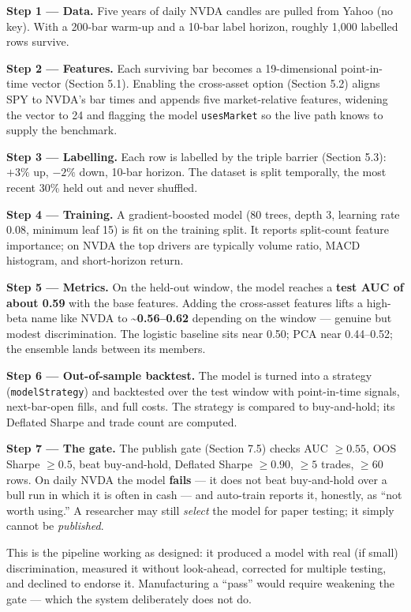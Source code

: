 \documentclass[
  11pt,
]{article}
\begin{document}
\textbf{Step 1 --- Data.} Five years of daily NVDA candles are pulled
from Yahoo (no key). With a 200-bar warm-up and a 10-bar label horizon,
roughly 1,000 labelled rows survive.

\textbf{Step 2 --- Features.} Each surviving bar becomes a
19-dimensional point-in-time vector (Section 5.1). Enabling the
cross-asset option (Section 5.2) aligns SPY to NVDA's bar times and
appends five market-relative features, widening the vector to 24 and
flagging the model \texttt{usesMarket} so the live path knows to supply
the benchmark.

\textbf{Step 3 --- Labelling.} Each row is labelled by the triple
barrier (Section 5.3): \(+3\%\) up, \(-2\%\) down, 10-bar horizon. The
dataset is split temporally, the most recent 30\% held out and never
shuffled.

\textbf{Step 4 --- Training.} A gradient-boosted model (80 trees, depth
3, learning rate 0.08, minimum leaf 15) is fit on the training split. It
reports split-count feature importance; on NVDA the top drivers are
typically volume ratio, MACD histogram, and short-horizon return.

\textbf{Step 5 --- Metrics.} On the held-out window, the model reaches a
\textbf{test AUC of about 0.59} with the base features. Adding the
cross-asset features lifts a high-beta name like NVDA to
\textbf{\textasciitilde0.56--0.62} depending on the window --- genuine
but modest discrimination. The logistic baseline sits near 0.50; PCA
near 0.44--0.52; the ensemble lands between its members.

\textbf{Step 6 --- Out-of-sample backtest.} The model is turned into a
strategy (\texttt{modelStrategy}) and backtested over the test window
with point-in-time signals, next-bar-open fills, and full costs. The
strategy is compared to buy-and-hold; its Deflated Sharpe and trade
count are computed.

\textbf{Step 7 --- The gate.} The publish gate (Section 7.5) checks AUC
\(\ge 0.55\), OOS Sharpe \(\ge 0.5\), beat buy-and-hold, Deflated Sharpe
\(\ge 0.90\), \(\ge 5\) trades, \(\ge 60\) rows. On daily NVDA the model
\textbf{fails} --- it does not beat buy-and-hold over a bull run in
which it is often in cash --- and auto-train reports it, honestly, as
``not worth using.'' A researcher may still \emph{select} the model for
paper testing; it simply cannot be \emph{published}.

This is the pipeline working as designed: it produced a model with real
(if small) discrimination, measured it without look-ahead, corrected for
multiple testing, and declined to endorse it. Manufacturing a ``pass''
would require weakening the gate --- which the system deliberately does
not do.
\end{document}
